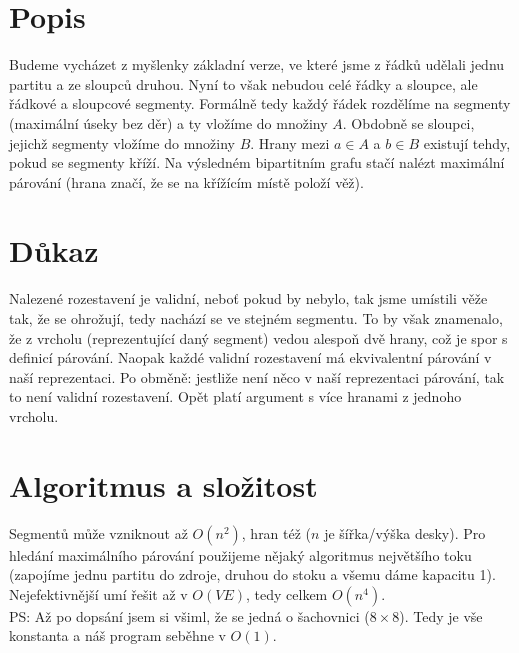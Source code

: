 \documentclass[a4paper]{article}
\begin{document}
\renewcommand{\headrulewidth}{0pt} %
\thispagestyle{fancy} %
{}

\section*{Popis}
Budeme vycházet z myšlenky základní verze, ve které jsme z řádků udělali jednu partitu a ze sloupců druhou. Nyní to však nebudou celé řádky a sloupce, ale řádkové a sloupcové segmenty. Formálně tedy každý řádek rozdělíme na segmenty (maximální úseky bez děr) a ty vložíme do množiny $A$. Obdobně se sloupci, jejichž segmenty vložíme do množiny $B$. Hrany mezi $a \in A$ a $b \in B$ existují tehdy, pokud se segmenty kříží. Na výsledném bipartitním grafu stačí nalézt maximální párování (hrana značí, že se na křížícím místě položí věž).

\section*{Důkaz} 
Nalezené rozestavení je validní, neboť pokud by nebylo, tak jsme umístili věže tak, že se ohrožují, tedy nachází se ve stejném segmentu. To by však znamenalo, že z vrcholu (reprezentující daný segment) vedou alespoň dvě hrany, což je spor s definicí párování. Naopak každé validní rozestavení má ekvivalentní párování v naší reprezentaci. Po obměně: jestliže není něco v naší reprezentaci párování, tak to není validní rozestavení. Opět platí argument s více hranami z jednoho vrcholu.


\section*{Algoritmus a složitost}
Segmentů může vzniknout až $O(n^2)$, hran též ($n$ je šířka/výška desky). Pro hledání maximálního párování použijeme nějaký algoritmus největšího toku (zapojíme jednu partitu do zdroje, druhou do stoku a všemu dáme kapacitu 1). Nejefektivnější umí řešit až v $O(VE)$, tedy celkem $O(n^4)$.
\\

PS: Až po dopsání jsem si všiml, že se jedná o šachovnici ($8 \times 8$). Tedy je vše konstanta a náš program seběhne v $O(1)$.
\end{document}
